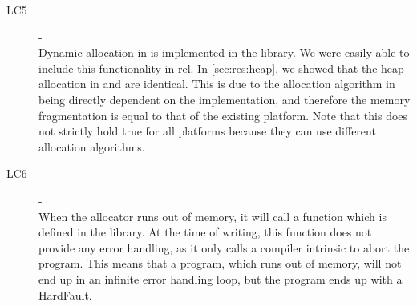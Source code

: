 \begin{description}
\item [LC5] - {\lcv} \hfill \\
  Dynamic allocation in {\rust} is implemented in the  library.
  We were easily able to include this functionality in \gls{rel}.
  In \autoref{sec:res:heap}, we showed that the heap allocation in {\rust} and {\C} are identical.
  This is due to the allocation algorithm in {\rust} being directly dependent on the   implementation, and therefore the memory fragmentation is equal to that of the existing {\C} platform.
  Note that this does not strictly hold true for all {\rust} platforms because they can use different allocation algorithms.

\item [LC6] - {\lcvi} \hfill \\
  When the {\rust} allocator runs out of memory, it will call a function which is defined in the  library.
  At the time of writing, this function does not provide any error handling, as it only calls a compiler intrinsic to abort the program.
  This means that a {\rust} program, which runs out of memory, will not end up in an infinite error handling loop, but the program ends up with a HardFault.

\end{description}
